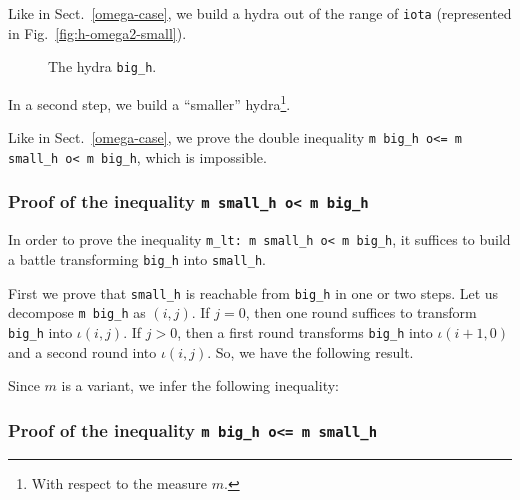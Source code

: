 Like in Sect.~\ref{omega-case}, we build a hydra out of the range of \texttt{iota} (represented in Fig.~\vref{fig:h-omega2-small}).

\begin{figure}[htb]
\centering
{}
\caption{\label{fig:h-omega2-small}}
 The hydra \texttt{big\_h}.
\end{figure}




 
 In a second step, we build a ``smaller'' hydra\footnote{With respect to the measure $m$.}.
 


\vspace{4pt}

Like in Sect.~\ref{omega-case}, we prove the double inequality \texttt{m big\_h o<= m small\_h o< m big\_h}, which is impossible.

\subsubsection{Proof of the inequality \texttt{m small\_h o< m big\_h}}

In order to prove the inequality  \texttt{m\_lt: m small\_h o< m big\_h}, it suffices to
build a battle transforming \texttt{big\_h} into \texttt{small\_h}.

First we prove that \texttt{small\_h} is reachable from \texttt{big\_h} in one or two steps. Let us decompose \texttt{m big\_h} as $(i,j)$.
If $j=0$, then one round suffices to transform \texttt{big\_h} into $\iota(i,j)$.
If $j>0$, then a first round transforms \texttt{big\_h} into $\iota(i+1,0)$ and a second round into $\iota(i,j)$. So, we have the following result.



Since $m$ is a variant, we infer the following inequality:





\subsubsection{Proof of the inequality \texttt{m big\_h o<= m small\_h} }


